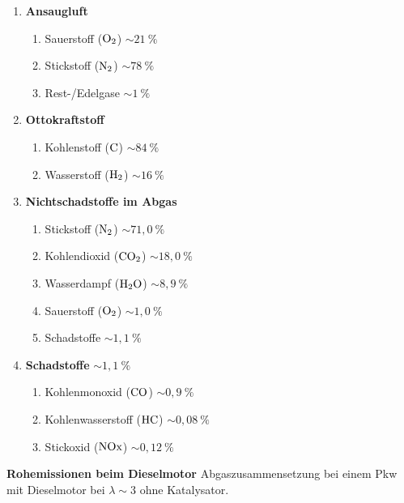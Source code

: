 \begin{enumerate}
\item
  \textbf{Ansaugluft}

  \begin{enumerate}
  \def\labelenumii{\arabic{enumii}.}
  \item
    Sauerstoff ($\ce{O2}$) $\sim 21~\%$
  \item
    Stickstoff ($\ce{N2}$) $\sim 78~\%$
  \item
    Rest-/Edelgase $\sim 1~\%$
  \end{enumerate}
\item
  \textbf{Ottokraftstoff}

  \begin{enumerate}
  \def\labelenumii{\arabic{enumii}.}
  \item
    Kohlenstoff ($\ce{C}$) $\sim 84~\%$
  \item
    Wasserstoff ($\ce{H2}$) $\sim 16~\%$
  \end{enumerate}
\item
  \textbf{Nichtschadstoffe im Abgas}

  \begin{enumerate}
  \def\labelenumii{\arabic{enumii}.}
  \item
    Stickstoff ($\ce{N2}$) $\sim 71,0~\%$
  \item
    Kohlendioxid ($\ce{CO2}$) $\sim 18,0~\%$
  \item
    Wasserdampf ($\ce{H2O}$) $\sim 8,9~\%$
  \item
    Sauerstoff ($\ce{O2}$) $\sim 1,0~\%$
  \item
    Schadstoffe $\sim 1,1~\%$
  \end{enumerate}
\item
  \textbf{Schadstoffe} $\sim 1,1~\%$

  \begin{enumerate}
  \def\labelenumii{\arabic{enumii}.}
  \item
    Kohlenmonoxid ($\ce{CO}$) $\sim 0,9~\%$
  \item
    Kohlenwasserstoff ($\ce{HC}$) $\sim 0,08~\%$
  \item
    Stickoxid ($\ce{NOx}$) $\sim 0,12~\%$
  \end{enumerate}
\end{enumerate}

\textbf{Rohemissionen beim Dieselmotor} Abgaszusammensetzung bei einem
Pkw mit Dieselmotor bei $\lambda \sim 3$ ohne Katalysator.

